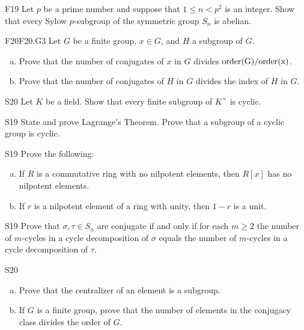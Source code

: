 \documentclass[../AlgebraQualSolutions.tex]{subfiles}
\begin{document}
\begin{prob}{F19}{}
Let $p$ be a prime number and suppose that $1 \leq n <p^2$ is an integer. Show that every Sylow $p$-subgroup of the symmetric group $S_n$ is abelian.
\end{prob}


\begin{prob}{F20}{F20.G3}
Let $G$ be a finite group, $x \in G$, and $H$ a subgroup of $G$.
\begin{enumerate}[(a)]
\item Prove that the number of conjugates of $x$ in $G$ divides $\rm{order}(G)/\rm{order}(x)$.
\item Prove that the number of conjugates of $H$ in $G$ divides the index of $H$ in $G$.
\end{enumerate}
\end{prob}

\begin{prob}{S20}{}
Let $K$ be a field. Show that every finite subgroup of $K^\times$ is cyclic.
\end{prob}

\begin{prob}{S19}{}
State and prove Lagrange's Theorem. Prove that a subgroup of a cyclic group is cyclic.
\end{prob}

\begin{prob}{S19}{}
Prove the following:
\begin{enumerate}[(a)]
\item If $R$ is a commutative ring with no nilpotent elements, then $R[x]$ has no nilpotent elements.
\item If $r$ is a nilpotent element of a ring with unity, then $1 - r$ is a unit.
\end{enumerate}
\end{prob}



\begin{prob}{S19}{}
Prove that $\sigma,\tau \in S_n$ are conjugate if and only if for each $m \geq 2$ the number of $m$-cycles in a cycle decomposition of $\sigma$ equals the number of $m$-cycles in a cycle decomposition of $\tau$.
\end{prob}

\begin{prob}{S20}{}
\begin{enumerate}[(a)]
\item Prove that the centralizer of an element is a subgroup.
\item If $G$ is a finite group, prove that the number of elements in the conjugacy class divides the order of $G$.
\end{enumerate}
\end{prob}
\end{document}
